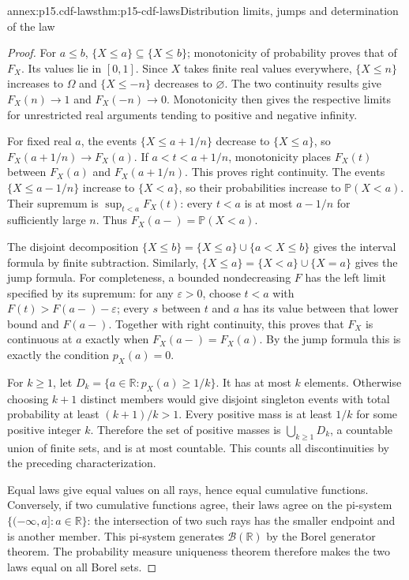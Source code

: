 \begin{annexitem}{annex:p15.cdf-laws}{thm:p15-cdf-laws}{Distribution limits, jumps and determination of the law}
\begin{proof}
For \(a\leq b\), \(\{X\leq a\}\subseteq\{X\leq b\}\);
monotonicity of probability proves that of \(F_X\). Its values lie
in \([0,1]\). Since \(X\) takes finite real values everywhere,
\(\{X\leq n\}\) increases to \(\Omega\) and
\(\{X\leq-n\}\) decreases to \(\varnothing\). The two
continuity results give \(F_X(n)\to1\) and \(F_X(-n)\to0\).
Monotonicity then gives the respective limits for unrestricted real
arguments tending to positive and negative infinity.

For fixed real \(a\), the events \(\{X\leq a+1/n\}\) decrease
to \(\{X\leq a\}\), so \(F_X(a+1/n)\to F_X(a)\).
If \(a<t<a+1/n\), monotonicity places \(F_X(t)\) between
\(F_X(a)\) and \(F_X(a+1/n)\). This proves right continuity.
The events \(\{X\leq a-1/n\}\) increase to \(\{X<a\}\),
so their probabilities increase to \(\mathbb P(X<a)\). Their
supremum is \(\sup_{t<a}F_X(t)\): every \(t<a\) is at most
\(a-1/n\) for sufficiently large \(n\). Thus
\(F_X(a-)=\mathbb P(X<a)\).

The disjoint decomposition
\(\{X\leq b\}=\{X\leq a\}\cup\{a<X\leq b\}\)
gives the interval formula by finite subtraction. Similarly,
\(\{X\leq a\}=\{X<a\}\cup\{X=a\}\) gives the jump formula.
For completeness, a bounded nondecreasing \(F\) has the left limit
specified by its supremum: for any \(\varepsilon>0\), choose
\(t<a\) with \(F(t)>F(a-)-\varepsilon\); every \(s\) between
\(t\) and \(a\) has its value between that lower bound and
\(F(a-)\). Together with right continuity, this proves that \(F_X\)
is continuous at \(a\) exactly when \(F_X(a-)=F_X(a)\).
By the jump formula this is exactly the condition \(p_X(a)=0\).

For \(k\geq1\), let \(D_k=\{a\in\mathbb R:p_X(a)\geq1/k\}\).
It has at most \(k\) elements. Otherwise choosing \(k+1\) distinct
members would give disjoint singleton events with total probability at
least \((k+1)/k>1\). Every positive mass is at least \(1/k\) for
some positive integer \(k\). Therefore the set of positive masses
is \(\bigcup_{k\geq1}D_k\), a countable union of finite sets, and
is at most countable. This counts all discontinuities by the preceding
characterization.

Equal laws give equal values on all rays, hence equal cumulative
functions. Conversely, if two cumulative functions agree, their laws
agree on the pi-system \(\{(-\infty,a]:a\in\mathbb R\}\): the
intersection of two such rays has the smaller endpoint and is another
member. This pi-system generates \(\mathcal B(\mathbb R)\) by the
Borel generator theorem. The probability measure uniqueness theorem
therefore makes the two laws equal on all Borel sets.
\end{proof}
\end{annexitem}

